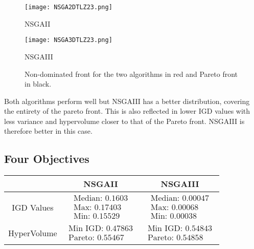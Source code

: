 \documentclass[a4paper,11pt]{article}
\numberwithin{equation}{section}
\begin{document}
\begin{figure}[h]
        \centering
        \begin{minipage}{0.48\textwidth} 
            \centering
            \texttt{[image: NSGA2DTLZ23.png]} 
            \caption*{NSGAII}
        \end{minipage}
        \hfill
        \begin{minipage}{0.48\textwidth} 
            \centering
            \texttt{[image: NSGA3DTLZ23.png]} 
            \caption*{NSGAIII} 
        \end{minipage}
        \caption{Non-dominated front for the two algorithms in red and Pareto front in black. } 
    \end{figure}

\noindent Both algorithms perform well but NSGAIII has a better distribution, covering the entirety of the pareto front. This is also reflected in lower IGD values with less variance and hypervolume closer to that of the Pareto front. NSGAIII is therefore better in this case.  

\subsection{Four Objectives}

\begin{table}[!h]
\begin{center}
\begin{tabular}{|c|c|c|}
\hline
 & NSGAII & NSGAIII \\
\hline
IGD Values &$\begin{array}{l}
\text{Median: 0.1603}\\
\text{Max: 0.17403}\\
\text{Min: 0.15529}\end{array}$&
$\begin{array}{l}
\text{Median: 0.00047}\\
\text{Max: 0.00068}\\
\text{Min: 0.00038}\end{array}$\\
\hline
HyperVolume &$\begin{array}{l}
\text{Min IGD: 0.47863}\\
\text{Pareto: 0.55467}\end{array}$&
$\begin{array}{l}
\text{Min IGD: 0.54843}\\
\text{Pareto: 0.54858}\end{array}$\\
\hline
\end{tabular}
\end{center}
\end{table}
\end{document}

